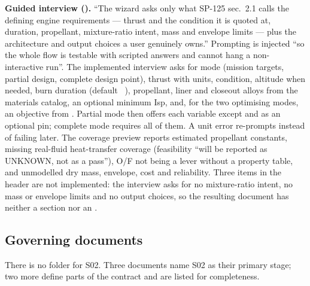 \textbf{Guided interview ().} ``The wizard asks only what SP-125 sec.~2.1 calls the defining engine requirements --- thrust and the condition it is quoted at, duration, propellant, mixture-ratio intent, mass and envelope limits --- plus the architecture and output choices a user genuinely owns.'' Prompting is injected ``so the whole flow is testable with scripted answers and cannot hang a non-interactive run''. The implemented interview asks for mode (mission targets, partial design, complete design point), thrust with units, condition, altitude when needed, burn duration (default ~), propellant, liner and closeout alloys from the materials catalog, an optional minimum Isp, and, for the two optimising modes, an objective from . Partial mode then offers each variable except  and  as an optional pin; complete mode requires all of them. A unit error re-prompts instead of failing later. The coverage preview reports estimated propellant constants, missing real-fluid heat-transfer coverage (feasibility ``will be reported as UNKNOWN, not as a pass''), O/F not being a lever without a property table, and unmodelled dry mass, envelope, cost and reliability. Three items in the header are not implemented: the interview asks for no mixture-ratio intent, no mass or envelope limits and no output choices, so the resulting document has neither a  section nor an .

\subsection{Governing documents}\label{sec:s02-docs}

There is no  folder for S02. Three documents name S02 as their primary stage; two more define parts of the contract and are listed for completeness.

